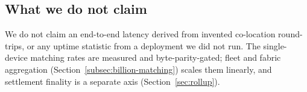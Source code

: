 \subsection{What we do not claim}

We do not claim an end-to-end latency derived from invented co-location round-trips, or any
uptime statistic from a deployment we did not run. The single-device matching rates are
measured and byte-parity-gated; fleet and fabric aggregation
(Section~\ref{subsec:billion-matching}) scales them linearly, and settlement finality is a
separate axis (Section~\ref{sec:rollup}).
